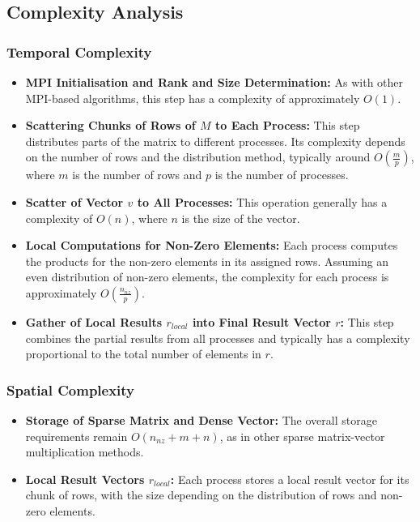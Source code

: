 \documentclass[12pt,oneside]{book} %
\begin{document}
\subsection{Complexity Analysis}
\subsubsection{Temporal Complexity}

\begin{itemize}
    \item \textbf{MPI Initialisation and Rank and Size Determination:} As with other MPI-based algorithms, this step has a complexity of approximately \( O(1) \).

    \item \textbf{Scattering Chunks of Rows of \( M \) to Each Process:} This step distributes parts of the matrix to different processes. Its complexity depends on the number of rows and the distribution method, typically around \( O(\frac{m}{p}) \), where \( m \) is the number of rows and \( p \) is the number of processes.

    \item \textbf{Scatter of Vector \( v \) to All Processes:} This operation generally has a complexity of \( O(n) \), where \( n \) is the size of the vector.

    \item \textbf{Local Computations for Non-Zero Elements:} Each process computes the products for the non-zero elements in its assigned rows. Assuming an even distribution of non-zero elements, the complexity for each process is approximately \( O(\frac{n_{nz}}{p}) \).

    \item \textbf{Gather of Local Results \( r_{local} \) into Final Result Vector \( r \):} This step combines the partial results from all processes and typically has a complexity proportional to the total number of elements in \( r \).
\end{itemize}

\subsubsection{Spatial Complexity}

\begin{itemize}
    \item \textbf{Storage of Sparse Matrix and Dense Vector:} The overall storage requirements remain \( O(n_{nz} + m + n) \), as in other sparse matrix-vector multiplication methods.

    \item \textbf{Local Result Vectors \( r_{local} \):} Each process stores a local result vector for its chunk of rows, with the size depending on the distribution of rows and non-zero elements.
\end{itemize}
\end{document}
